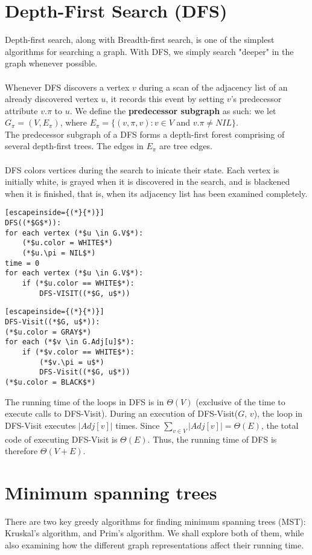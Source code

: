 \documentclass[a4paper]{article}
\begin{document}
\section{Depth-First Search (DFS)}
Depth-first search, along with Breadth-first search, is one of the simplest algorithms for searching a graph. With DFS, we simply search "deeper" in the graph whenever possible.\\\\
Whenever DFS discovers a vertex $v$ during a scan of the adjacency list of an already discovered vertex $u$, it records this event by setting $v$'s predecessor attribute $v.\pi$ to $u$. We define the \textbf{predecessor subgraph} as such: we let $G_\pi = (V, E_\pi)$, where $E_\pi = \{(v, \pi, v): v\in V$ and $v.\pi \neq NIL\}$.\\
The predecessor subgraph of a DFS forms a depth-first forest comprising of several depth-first trees. The edges in $E_\pi$ are tree edges.\\\\
DFS colors vertices during the search to inicate their state. Each vertex is initially white, is grayed when it is discovered in the search, and is blackened when it is finished, that is, when its adjacency list has been examined completely.
\begin{lstlisting}[escapeinside={(*}{*)}]
DFS((*$G$*)):
for each vertex (*$u \in G.V$*):
	(*$u.color = WHITE$*)
	(*$u.\pi = NIL$*)
time = 0
for each vertex (*$u \in G.V$*):
	if (*$u.color == WHITE$*):
		DFS-VISIT((*$G, u$*))
\end{lstlisting}
\begin{lstlisting}[escapeinside={(*}{*)}]
DFS-Visit((*$G, u$*)):
(*$u.color = GRAY$*)
for each (*$v \in G.Adj[u]$*):
	if (*$v.color == WHITE$*):
		(*$v.\pi = u$*)
		DFS-Visit((*$G, u$*))
(*$u.color = BLACK$*)
\end{lstlisting}
The running time of the loops in DFS is in $\Theta(V)$ (exclusive of the time to execute calls to DFS-Visit). During an execution of DFS-Visit($G$, $v$), the loop in DFS-Visit executes $|Adj[v]|$ times. Since $\sum\limits_{v\in V}^{ }|Adj[v]| = \Theta(E)$, the total code of executing DFS-Visit is $\Theta(E)$. Thus, the running time of DFS is therefore $\Theta(V + E)$.

\section{Minimum spanning trees}
There are two key greedy algorithms for finding minimum spanning trees (MST): Kruskal's algorithm, and Prim's algorithm. We shall explore both of them, while also examining how the different graph representations affect their running time.
\end{document}
